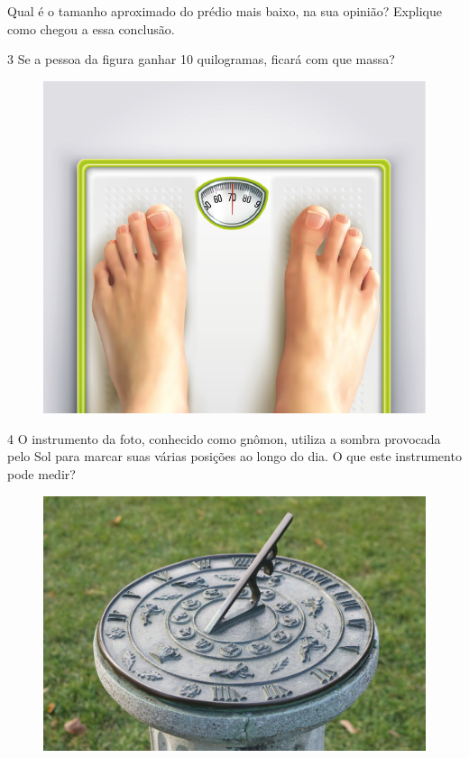 Qual é o tamanho aproximado do prédio mais baixo, na sua opinião?
Explique como chegou a essa conclusão.


\pagebreak
\num{3} Se a pessoa da figura ganhar 10 quilogramas, ficará com que massa?


\begin{figure}[htpb!]
\centering
\includegraphics[width=.6\textwidth]{./media/image32.png}
\end{figure}


\num{4} O instrumento da foto, conhecido como gnômon, utiliza a sombra
provocada pelo Sol para marcar suas várias posições ao longo do dia. O
que este instrumento pode medir?


\begin{figure}[htpb!]
\centering
\includegraphics[width=.5\textwidth]{./media/image33.png}
\end{figure}

